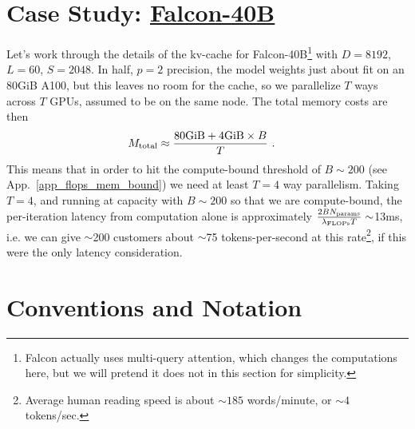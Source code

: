 \documentclass[11pt]{article}
\begin{document}
\section{Case Study: \href{https://huggingface.co/tiiuae/falcon-40b-instruct?_sm_vck=j230jZ2ssDkkPfJTfRt6tjQNTQZJ65N7VDWmj5Ff6f3jZ3mhh2Pq}{Falcon-40B}}

Let's work through the details of the kv-cache for Falcon-40B\footnote{Falcon actually uses
multi-query attention, which changes the computations here, but we will pretend it does not in this
section for simplicity.} with $ D=8192 $, $ L=60 $, $ S=2048 $.  In half, $ p=2 $ precision, the model weights just about fit on an
80GiB A100, but this leaves no room for the cache, so we parallelize $ T $ ways across $ T $ GPUs,
assumed to be on the same node. The total memory costs are then
\begin{align}
    M _{ {\rm  total} } &\approx  \frac{ {\rm 80GiB} + {\rm 4GiB}\times B }{ T } \ .
\end{align}
This means that in order to hit the compute-bound threshold of $ B \sim 200 $ (see
App.~\ref{app_flops_mem_bound}) we need at least $ T=4 $ way parallelism.  Taking $ T=4 $, and
running at capacity with $ B \sim 200$ so that we are compute-bound, the per-iteration latency from
computation alone is approximately $ \frac{2BN _{ {\rm params} } }{ \lambda _{ {\rm FLOPs} } T} \sim
$13ms, i.e. we can give $ \sim $200 customers about $ \sim $75 tokens-per-second at this
rate\footnote{Average human reading speed is about $ \sim 185$ words/minute, or $ \sim 4
$tokens/sec.}, if this were the only latency consideration.











\appendix



\section{Conventions and Notation\label{app_conventions}}
\end{document}
